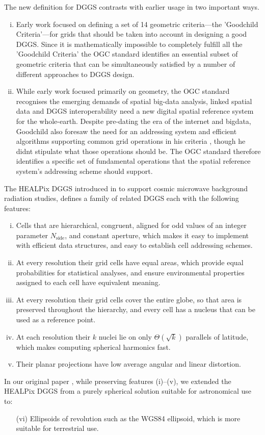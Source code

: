 \documentclass[12pt]{iopart}
\newcommand{\nside}{N_{\text{side}}}
\begin{document}
The new definition for DGGS contrasts with earlier usage in two important ways. 
\begin{enumerate}[(i)] 
    \item Early work \citep{Good1994, KSWS1999, SWK2003} focused on defining a set of 14 geometric criteria---the 'Goodchild Criteria'---for grids that should be taken into account in designing a good DGGS. Since it is mathematically impossible \citep{KSWS1999} to completely fulfill all the 'Goodchild Criteria' the OGC standard identifies an essential subset of geometric criteria that can be simultaneously satisfied by a number of different approaches to DGGS design.
    \item While early work focused primarily on geometry, the OGC standard recognises the emerging demands of spatial big-data analysis, linked spatial data and DGGS interoperability need a new digital spatial reference system for the whole-earth. Despite pre-dating the era of the internet and bigdata,  Goodchild also foresaw the need for an addressing system and efficient algorithms supporting common grid operations in his criteria \citep{Good1994}, though he didnt stipulate what those operations should be. The OGC standard therefore identifies a specific set of fundamental operations that the spatial reference system's addressing scheme should support. 
\end{enumerate}

The HEALPix DGGS introduced in \citep{GHBW2005} to support  cosmic microwave background radiation studies, defines a family of related DGGS each with the following features:
\begin{enumerate}[(i)] 
    \item Cells that are hierarchical, congruent, aligned for odd values of an integer parameter $\nside$, and constant aperture, which makes it easy to implement with efficient data structures, and easy to establish cell addressing schemes.
    \item At every resolution their grid cells have equal areas, which provide equal probabilities for statistical analyses, and ensure environmental properties assigned to each cell have equivalent meaning. 
    \item At every resolution their grid cells cover the entire globe, so that area is preserved throughout the hierarchy, and every cell has a nucleus that can be used as a reference point.
    \item At each resolution their $k$ nuclei lie on only $\Theta(\sqrt{k})$ parallels of latitude, which makes computing spherical harmonics fast.
    \item Their planar projections have low average angular and linear distortion.
\end{enumerate}
In our original paper \citep{GiRa2013}, while preserving features (i)--(v), we extended the HEALPix DGGS from a purely spherical solution suitable for astronomical use to:
\begin{enumerate}[(i)] 
    \item[(vi)] Ellipsoids of revolution such as the WGS84 ellipsoid, which is more suitable for terrestrial use.
\end{enumerate}
\end{document}
